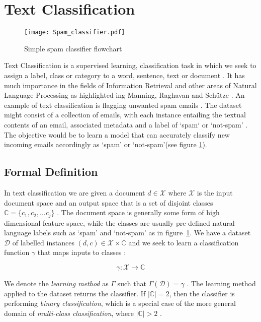 \documentclass[Dissertation.tex]{subfiles}
\begin{document}
\section{Text Classification}


\begin{figure}
	\hspace*{1.75cm}
	\centering
	\texttt{[image: Spam\_classifier.pdf]}
	\caption{Simple spam classifier flowchart}
	\label{spamClassifier}
\end{figure}
Text Classification is a supervised learning, classification task in which we seek to assign a label, class or category to a word, sentence, text or document \cite{jurafskySpeechLanguageProcessing}. It has much importance in the fields of Information Retrieval and other areas of Natural Language Processing  as highlighted ing Manning, Raghavan and Sch\"{u}tze \cite{manningIntroductionInformationRetrieval2009}.
An example of text classification is flagging unwanted spam emails \cite{geronHandsonMachineLearning2017}. The dataset might consist of a collection of emails, with each instance entailing the textual contents of an email, associated metadata and a label of `spam` or `not-spam' \cite{geronHandsonMachineLearning2017}. The objective would be to learn a model that can accurately classify new incoming emails accordingly as `spam' or `not-spam'(see figure \ref{spamClassifier}). 

\subsection{Formal Definition}
In text classification we are given a document $ d \in \mathcal{X}$ where $ \mathcal{X} $ is the input document space and an output space that is a set of disjoint classes $ \mathbb{C} = \{c_1,c_2,\dots c_j\}$ \cite{manningIntroductionInformationRetrieval2009}. The document space is generally some form of high dimensional feature space, while the classes are usually pre-defined natural language labels such as `spam' and `not-spam' as in figure~\ref{spamClassifier}\cite{manningIntroductionInformationRetrieval2009}. We have a dataset $\mathcal{D}$ of labelled instances $(d,c) \in \mathcal{X}\times \mathbb{C}$ and we seek to learn a classification function $ \gamma $ that maps inputs to classes \cite{manningIntroductionInformationRetrieval2009}:

$$
\gamma: \mathcal{X}\rightarrow \mathbb{C}
$$

We denote the \textit{learning method} as $ \Gamma $ such that $ \Gamma(\mathcal{D})= \gamma $ \cite{manningIntroductionInformationRetrieval2009}. The learning method applied to the dataset returns the classifier.  If $ |\mathbb{C}| = 2 $, then the classifier is performing \textit{binary classification}, which is a special case of the more general domain of \textit{multi-class classification}, where $ |\mathbb{C}| > 2 $ \cite{manningIntroductionInformationRetrieval2009}.
\end{document}

